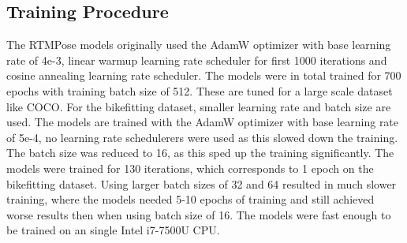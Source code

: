 \subsection{Training Procedure}
The RTMPose models originally used the AdamW \cite{adamw} optimizer with base learning rate of 4e-3, linear warmup learning rate scheduler for first 1000 iterations and cosine annealing learning rate scheduler. The models were in total trained for 700 epochs with training batch size of 512. These are tuned for a large scale dataset like COCO. For the bikefitting dataset, smaller learning rate and batch size are used. The models are trained with the AdamW optimizer with base learning rate of 5e-4, no learning rate schedulerers were used as this slowed down the training. The batch size was reduced to 16, as this sped up the training significantly. The models were trained for 130 iterations, which corresponds to 1 epoch on the bikefitting dataset. Using larger batch sizes of 32 and 64 resulted in much slower training, where the models needed 5-10 epochs of training and still achieved worse results then when using batch size of 16. The models were fast enough to be trained on an single Intel i7-7500U CPU.


